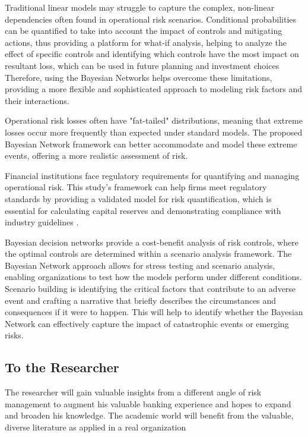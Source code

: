 Traditional linear models may struggle to capture the complex, non-linear dependencies often found in operational risk scenarios. Conditional probabilities can be quantified to take into account the impact of controls and mitigating actions, thus providing a platform for what-if analysis, helping to analyze the effect of specific controls and identifying which controls have the most impact on resultant loss, which can be used in future planning and investment choices Therefore, using the Bayesian Networks helps overcome these limitations, providing a more flexible and sophisticated approach to modeling risk factors and their interactions.

Operational risk losses often have "fat-tailed" distributions, meaning that extreme losses occur more frequently than expected under standard models. The proposed Bayesian Network framework can better accommodate and model these extreme events, offering a more realistic assessment of risk.

Financial institutions face regulatory requirements for quantifying and managing operational risk. This study's framework can help firms meet regulatory standards by providing a validated model for risk quantification, which is essential for calculating capital reserves and demonstrating compliance with industry guidelines \parencite{IMF2023_Zimbabwe}.

Bayesian decision networks provide a cost-benefit analysis of risk controls, where the optimal controls are determined within a scenario analysis framework. The Bayesian Network approach allows for stress testing and scenario analysis, enabling organizations to test how the models perform under different conditions.  Scenario building is identifying the critical factors that contribute to an adverse event and crafting a narrative that briefly describes the circumstances and consequences if it were to happen. This will help to identify whether the Bayesian Network can effectively capture the impact of catastrophic events or emerging risks.
\subsection{To the Researcher}
The researcher will gain valuable insights from a different angle of risk management to augment his valuable banking experience and hopes to expand and broaden his knowledge. The academic world will benefit from the valuable, diverse literature as applied in a real organization

